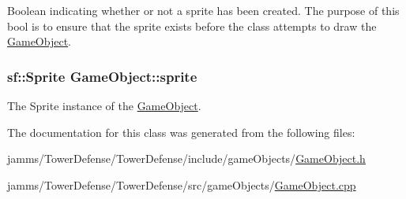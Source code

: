 Boolean indicating whether or not a sprite has been created. The purpose of this bool is to ensure that the sprite exists before the class attempts to draw the \hyperlink{class_game_object}{Game\+Object}. 

\hypertarget{class_game_object_abb3608f1c76edd590e023585c2216f02}{
\subsubsection[{sprite}]{\setlength{\rightskip}{0pt plus 5cm}sf\+::\+Sprite Game\+Object\+::sprite\hspace{0.3cm}{\ttfamily [protected]}}}\label{class_game_object_abb3608f1c76edd590e023585c2216f02}


The Sprite instance of the \hyperlink{class_game_object}{Game\+Object}. 



The documentation for this class was generated from the following files\+:\begin{DoxyCompactItemize}
\item 
jamms/\+Tower\+Defense/\+Tower\+Defense/include/game\+Objects/\hyperlink{_game_object_8h}{Game\+Object.\+h}\item 
jamms/\+Tower\+Defense/\+Tower\+Defense/src/game\+Objects/\hyperlink{_game_object_8cpp}{Game\+Object.\+cpp}\end{DoxyCompactItemize}

